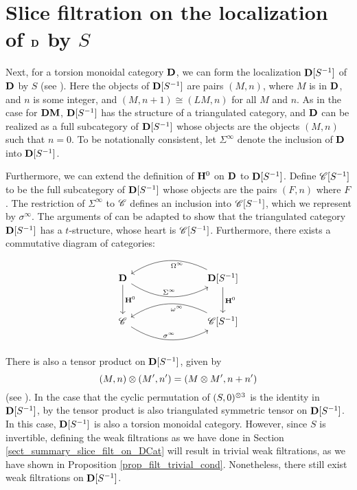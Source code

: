 \section{Slice filtration on the localization of $\mathbf{D}$ by $S$}

Next, for a torsion monoidal category $\mathbf{D}$, we can form the
localization $\mathbf{D}[S^{-1}]$ of $\mathbf{D}$ by $S$ (see \cite[8A]{MVW}). 
Here the objects of $\mathbf{D}[S^{-1}]$ are pairs $(M, n)$, where $M$ is 
in $\mathbf{D}$, and $n$ is some integer, and $(M, n + 1) \cong (LM, 
n)$ for all $M$ and $n$. As in the case for $\mathbf{DM}$, $\mathbf{D}[S^{-1}]$
has the structure of a triangulated category, and $\mathbf{D}$ can be
realized as a full subcategory of $\mathbf{D}[S^{-1}]$ whose objects
are the objects $(M, n)$ such that $n = 0$. To be notationally
consistent, let $\Sigma^\infty$ denote the inclusion of $\mathbf{D}$
into $\mathbf{D}[S^{-1}]$.

Furthermore, we can extend the definition of $\mathbf{H}^0$ on $\mathbf{D}$ to 
$\mathbf{D}[S^{-1}]$. Define $\mathscr{C}[{S}^{-1}]$ to be the full subcategory
of $\mathbf{D}[S^{-1}]$ whose objects are the pairs $(F, n)$ where $F$.
The restriction of $\Sigma^\infty$ to $\mathscr{C}$ defines an 
inclusion into $\mathscr{C}[{S}^{-1}]$, which we represent by 
$\sigma^\infty$. The arguments of \cite[5.6]{DegModHom} can be 
adapted to show that the triangulated category $\mathbf{D}[S^{-1}]$ has 
a $t$-structure, whose heart is $\mathscr{C}[{S}^{-1}]$. Furthermore, 
there exists a commutative diagram of categories:
\[
\begin{tikzcd}[column sep=75pt, row sep=large]
\DCat \arrow[bend right]{r}{\Sigma^{\infty}} \arrow{d}{\HH^0} &
\DCatLoc{S} \arrow[bend right]{l}{\Omega^\infty} \arrow{d}{\HH^0} \\
\Cat{C} \arrow[bend right]{r}{\sigma^\infty}  &
\CatLoc{C}{S} \arrow[bend right]{l}{\omega^\infty}
\end{tikzcd}
\]

There is also a tensor product on $\mathbf{D}[S^{-1}]$, given by
\[
(M, n) \otimes (M', n') = (M \otimes M', n + n')
\]
(see \cite[8A]{MVW}). In the case that the cyclic permutation of 
$(S, 0)^{\otimes 3}$ is the identity in $\mathbf{D}[S^{-1}]$, by 
\cite[8A.10, 8A.11]{DegModHom} the tensor product is also 
triangulated symmetric tensor on $\mathbf{D}[S^{-1}]$. In this case, 
$\mathbf{D}[S^{-1}]$ is also a torsion monoidal category. However, since 
$S$ is invertible, defining the weak filtrations as we have done 
in Section \ref{sect_summary_slice_filt_on_DCat} will result in 
trivial weak filtrations, as we have shown in Proposition 
\ref{prop_filt_trivial_cond}. Nonetheless, there still exist 
weak filtrations on $\mathbf{D}[S^{-1}]$.

